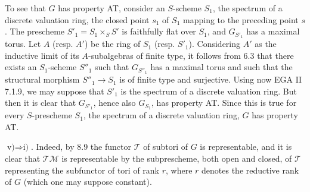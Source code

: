 To see that $G$ has property AT, consider an $S$-scheme $S_1$, the spectrum of a discrete valuation ring, the closed point $s_1$ of $S_1$ mapping to the preceding point $s$. The prescheme $S'_1=S_1\times_S S'$ is faithfully flat over $S_1$, and $G_{S'_1}$ has a maximal torus. Let $A$ (resp. $A'$) be the ring of $S_1$ (resp. $S'_1$). Considering $A'$ as the inductive limit of its $A$-subalgebras of finite type, it follows from 6.3 that there exists an $S_1$-scheme $S''_1$ such that $G_{S''_1}$ has a maximal torus and such that the structural morphism $S''_1\to S_1$ is of finite type and surjective. Using now EGA II 7.1.9, we may suppose that $S'_1$ is the spectrum of a discrete valuation ring. But then it is clear that $G_{S'_1}$, hence also $G_{S_1}$, has property AT. Since this is true for every $S$-prescheme $S_1$, the spectrum of a discrete valuation ring, $G$ has property AT.

$\text{v)}\Rightarrow\text{i)}$. Indeed, by 8.9 the functor $\mathscr T$ of subtori of $G$ is representable, and it is clear that $\mathscr{TM}$ is representable by the subprescheme, both open and closed, of $\mathscr T$ representing the subfunctor of tori of rank $r$, where $r$ denotes the reductive rank of $G$ (which one may suppose constant).
